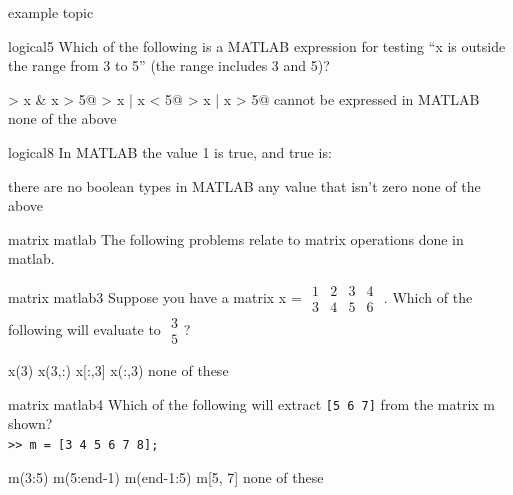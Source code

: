 \documentclass{exam}
\begin{document}
\begin{blo}{example topic}
\begin{problem}[requires=logical]{logical}{5} 
  Which of the following is a MATLAB expression for testing ``x is
  outside the range from 3 to 5'' (the range includes 3 and 5)? 
  \begin{answers}  
    \answer {} > x & x > 5@
    \answer {} > x | x < 5@
    \answer[correct]  > x | x > 5@ %
    \answer[fixed] cannot be expressed in MATLAB %
    \answer[fixed] none of the above %
  \end{answers}
\end{problem}

\begin{problem}[require=logical]{logical}{8} 
  In MATLAB the value 1 is true, and true is:
  \begin{answers} 
    \answer there are no boolean types in MATLAB
    \answer[correct] any value that isn't zero %
    \answer[fixed] none of the above %
  \end{answers}
\end{problem}

\begin{block}{matrix matlab}
The following problems relate to matrix operations done in matlab.
\end{block}

\begin{problem}[requires=matrix matlab]{matrix matlab}{3}
 Suppose you have a matrix x = \footnotesize
$\begin{array}{cccc}1 & 2 & 3 & 4\\3 & 4 & 5 & 6\end{array}$
\normalsize. Which of the following will evaluate to \footnotesize
$\begin{array}{c}3 \\ 5\end{array}$\normalsize?
  \begin{answers}   
    \answer x(3)
    \answer x(3,:)
    \answer x[:,3]
    \answer[correct] x(:,3) %
    \answer[fixed] none of these %
   \end{answers}
\end{problem}

\begin{problem}[requires=matrix matlab]{matrix matlab}{4} 
  Which of the following will extract \texttt{[5 6 7]} from the matrix m
  shown?\\
\texttt{>> m = [3 4 5 6 7 8];
}
  \begin{answers}
    \answer[correct] m(3:5) %
    \answer m(5:end-1)
    \answer m(end-1:5)
    \answer m[5, 7]
    \answer[fixed] none of these %
  \end{answers}
\end{problem}



\end{blo}
\end{document}

